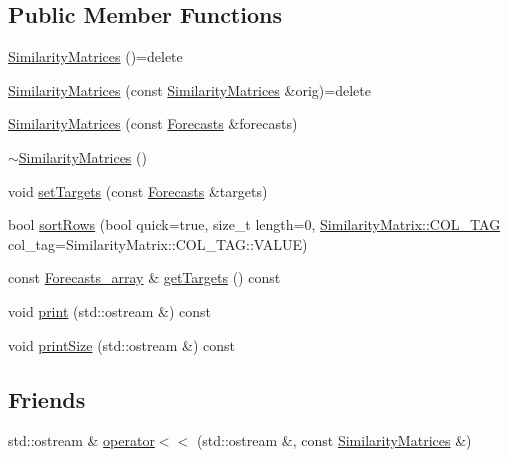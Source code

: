 \subsection*{Public Member Functions}
\begin{DoxyCompactItemize}
\item 
\mbox{\hyperlink{class_similarity_matrices_a4dc7fe147a9c1ac927a11918f206a306}{Similarity\+Matrices}} ()=delete
\item 
\mbox{\hyperlink{class_similarity_matrices_a915fa9a5b1906a6e48a102be543de8b2}{Similarity\+Matrices}} (const \mbox{\hyperlink{class_similarity_matrices}{Similarity\+Matrices}} \&orig)=delete
\item 
\mbox{\hyperlink{class_similarity_matrices_a755e371b0c34799237aaffc2b7410232}{Similarity\+Matrices}} (const \mbox{\hyperlink{class_forecasts}{Forecasts}} \&forecasts)
\item 
\mbox{\hyperlink{class_similarity_matrices_a255b73355331573de8e038b9f1c28b6b}{$\sim$\+Similarity\+Matrices}} ()
\item 
void \mbox{\hyperlink{class_similarity_matrices_a639c9702983460a7c0b443f3da7b18f4}{set\+Targets}} (const \mbox{\hyperlink{class_forecasts}{Forecasts}} \&targets)
\item 
bool \mbox{\hyperlink{class_similarity_matrices_a354f7292eee8b3977c223fae7667e6a9}{sort\+Rows}} (bool quick=true, size\+\_\+t length=0, \mbox{\hyperlink{class_similarity_matrix_a79098014d74c2cf85f0dd8ad7fc4ac4f}{Similarity\+Matrix\+::\+C\+O\+L\+\_\+\+T\+AG}} col\+\_\+tag=Similarity\+Matrix\+::\+C\+O\+L\+\_\+\+T\+A\+G\+::\+V\+A\+L\+UE)
\item 
const \mbox{\hyperlink{class_forecasts__array}{Forecasts\+\_\+array}} \& \mbox{\hyperlink{class_similarity_matrices_a17f864e7a279029be249e5f0d3abb9e6}{get\+Targets}} () const
\item 
void \mbox{\hyperlink{class_similarity_matrices_a4c179c4c5ea3bb2f187ea5e26b4b853b}{print}} (std\+::ostream \&) const
\item 
void \mbox{\hyperlink{class_similarity_matrices_a7ab85a46c3d93d519b6ea89a4856938a}{print\+Size}} (std\+::ostream \&) const
\end{DoxyCompactItemize}
\subsection*{Friends}
\begin{DoxyCompactItemize}
\item 
std\+::ostream \& \mbox{\hyperlink{class_similarity_matrices_af149863a23588d5fe79dacef6d1a5edd}{operator$<$$<$}} (std\+::ostream \&, const \mbox{\hyperlink{class_similarity_matrices}{Similarity\+Matrices}} \&)
\end{DoxyCompactItemize}


